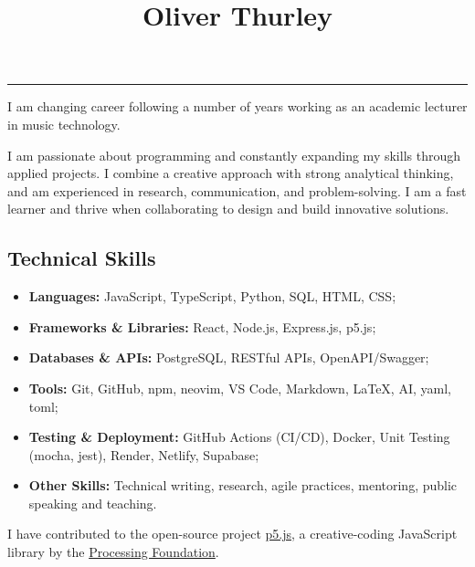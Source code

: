 \documentclass[10pt,a4paper]{article}
\title{{\huge Oliver Thurley}{\raggedright}}
\author{}
\date{}
\makeatletter
\renewcommand{\maketitle}{\bgroup\setlength{\parindent}{0pt}
\begin{flushleft}
  \normalfont{\@title}
  \@author
\end{flushleft}\egroup
}
\providecommand{\tightlist}{%
  \setlength{\itemsep}{0pt}\setlength{\parskip}{0pt}}
\makeatother
\begin{document}
\maketitle

\vspace{0.5em}
\noindent\href{mailto:o.thrly@gmail.com}{}%
{}%
\href{https://thrly.com}{}%
\href{https://github.com/thrly}{}%
\href{https://linkedin.com/in/oliver-thurley}{}

\vspace{0.75em}
\noindent\rule{\textwidth}{0.5pt}

I am changing career following a number of years working as an academic
lecturer in music technology.

I am passionate about programming and constantly expanding my skills
through applied projects. I combine a creative approach with strong
analytical thinking, and am experienced in research, communication, and
problem-solving. I am a fast learner and thrive when collaborating to
design and build innovative solutions.

\subsection{Technical Skills}\label{technical-skills}

\begin{itemize}
\tightlist
\item
  \textbf{Languages:} JavaScript, TypeScript, Python, SQL, HTML, CSS;
\item
  \textbf{Frameworks \& Libraries:} React, Node.js, Express.js, p5.js;
\item
  \textbf{Databases \& APIs:} PostgreSQL, RESTful APIs, OpenAPI/Swagger;
\item
  \textbf{Tools:} Git, GitHub, npm, neovim, VS Code, Markdown, LaTeX,
  AI, yaml, toml;
\item
  \textbf{Testing \& Deployment:} GitHub Actions (CI/CD), Docker, Unit
  Testing (mocha, jest), Render, Netlify, Supabase;
\item
  \textbf{Other Skills:} Technical writing, research, agile practices,
  mentoring, public speaking and teaching.
\end{itemize}

I have contributed to the open-source project
\href{https://p5js.org/}{p5.js}, a creative-coding JavaScript library by
the \href{https://processingfoundation.org/}{Processing Foundation}.
\end{document}
